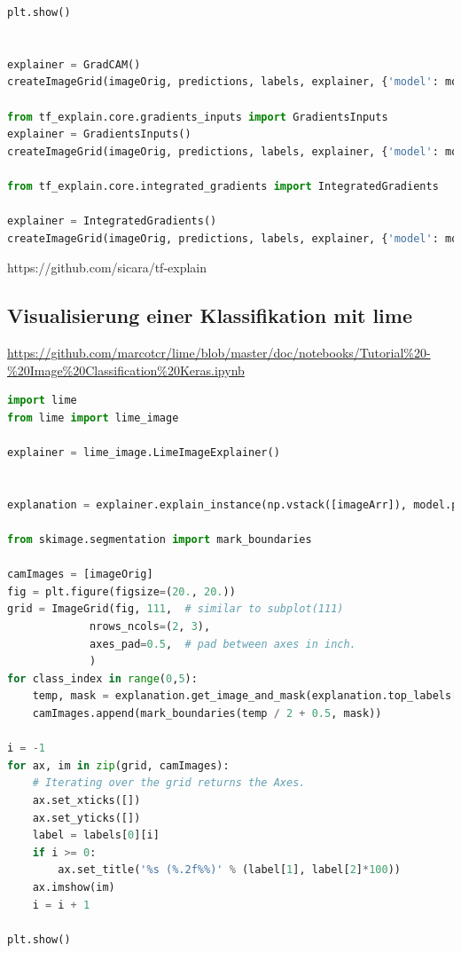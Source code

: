 \documentclass[
  12pt, %
  a4paper, %
  oneside, %
  openany, 
  numbers=noenddot, %
  BCOR=5mm, %
  parskip=half*, %
  thesis, %
]{bfhbook}
\begin{document}
\begin{lstlisting}[language=Python, caption=Visualisiertes Neuronales Netz mit Tensorflow und tf-explain]
    plt.show()


explainer = GradCAM()
createImageGrid(imageOrig, predictions, labels, explainer, {'model': model, 'layer_name': 'block5_conv3', 'validation_data': data})

from tf_explain.core.gradients_inputs import GradientsInputs
explainer = GradientsInputs()
createImageGrid(imageOrig, predictions, labels, explainer, {'model': model, 'validation_data': (np.array([imageArr]), None)})

from tf_explain.core.integrated_gradients import IntegratedGradients

explainer = IntegratedGradients()
createImageGrid(imageOrig, predictions, labels, explainer, {'model': model, 'validation_data': (np.array([imageArr]), None)})
\end{lstlisting}
https://github.com/sicara/tf-explain

\subsection{Visualisierung einer Klassifikation mit lime}
\url{https://github.com/marcotcr/lime/blob/master/doc/notebooks/Tutorial\%20-\%20Image\%20Classification\%20Keras.ipynb}
\begin{lstlisting}[language=Python, caption=Visualisiertes Neuronales Netz mit Tensorflow und lime]
import lime 
from lime import lime_image

explainer = lime_image.LimeImageExplainer()


explanation = explainer.explain_instance(np.vstack([imageArr]), model.predict, top_labels=5, hide_color=0, num_samples=1000)

from skimage.segmentation import mark_boundaries

camImages = [imageOrig]
fig = plt.figure(figsize=(20., 20.))
grid = ImageGrid(fig, 111,  # similar to subplot(111)
             nrows_ncols=(2, 3),
             axes_pad=0.5,  # pad between axes in inch.
             )
for class_index in range(0,5):
    temp, mask = explanation.get_image_and_mask(explanation.top_labels[class_index], positive_only=True, num_features=5, hide_rest=True)
    camImages.append(mark_boundaries(temp / 2 + 0.5, mask))

i = -1
for ax, im in zip(grid, camImages):
    # Iterating over the grid returns the Axes.
    ax.set_xticks([])
    ax.set_yticks([])
    label = labels[0][i]
    if i >= 0:
        ax.set_title('%s (%.2f%%)' % (label[1], label[2]*100))
    ax.imshow(im)
    i = i + 1

plt.show()
\end{lstlisting}
\appendix
\listoffigures
\begingroup
\let\clearpage\relax
\listoftables
\printglossary[type=\acronymtype]
\printglossary[type=main]
\printbibliography
\end{document}
